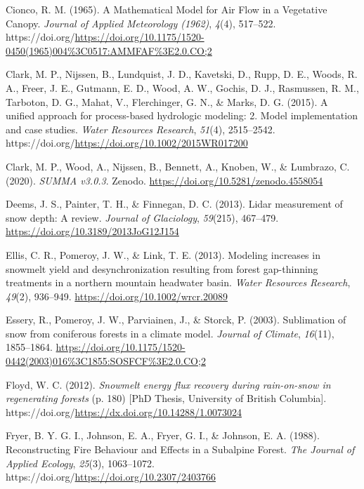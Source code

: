 \documentclass[
  letterpaper,
  DIV=11,
  numbers=noendperiod]{scrartcl}
\newlength{\cslhangindent}
\newenvironment{CSLReferences}[2] %
 {\begin{list}{}{%
  \setlength{\itemindent}{0pt}
  \setlength{\leftmargin}{0pt}
  \setlength{\parsep}{0pt}
  \ifodd #1
   \setlength{\leftmargin}{\cslhangindent}
   \setlength{\itemindent}{-1\cslhangindent}
  \fi
  \setlength{\itemsep}{#2\baselineskip}}}
 {\end{list}}
\begin{document}
\begin{CSLReferences}{1}{0}
Cionco, R. M. (1965). {A Mathematical Model for Air Flow in a Vegetative
Canopy}. \emph{Journal of Applied Meteorology (1962)}, \emph{4}(4),
517--522.
https://doi.org/\url{https://doi.org/10.1175/1520-0450(1965)004\%3C0517:AMMFAF\%3E2.0.CO;2}

Clark, M. P., Nijssen, B., Lundquist, J. D., Kavetski, D., Rupp, D. E.,
Woods, R. A., Freer, J. E., Gutmann, E. D., Wood, A. W., Gochis, D. J.,
Rasmussen, R. M., Tarboton, D. G., Mahat, V., Flerchinger, G. N., \&
Marks, D. G. (2015). {A unified approach for process-based hydrologic
modeling: 2. Model implementation and case studies}. \emph{Water
Resources Research}, \emph{51}(4), 2515--2542.
https://doi.org/\url{https://doi.org/10.1002/2015WR017200}

Clark, M. P., Wood, A., Nijssen, B., Bennett, A., Knoben, W., \&
Lumbrazo, C. (2020). \emph{{SUMMA v3.0.3}}. Zenodo.
\url{https://doi.org/10.5281/zenodo.4558054}

Deems, J. S., Painter, T. H., \& Finnegan, D. C. (2013). {Lidar
measurement of snow depth: A review}. \emph{Journal of Glaciology},
\emph{59}(215), 467--479. \url{https://doi.org/10.3189/2013JoG12J154}

Ellis, C. R., Pomeroy, J. W., \& Link, T. E. (2013). {Modeling increases
in snowmelt yield and desynchronization resulting from forest
gap-thinning treatments in a northern mountain headwater basin}.
\emph{Water Resources Research}, \emph{49}(2), 936--949.
\url{https://doi.org/10.1002/wrcr.20089}

Essery, R., Pomeroy, J. W., Parviainen, J., \& Storck, P. (2003).
{Sublimation of snow from coniferous forests in a climate model}.
\emph{Journal of Climate}, \emph{16}(11), 1855--1864.
\url{https://doi.org/10.1175/1520-0442(2003)016\%3C1855:SOSFCF\%3E2.0.CO;2}

Floyd, W. C. (2012). \emph{{Snowmelt energy flux recovery during
rain-on-snow in regenerating forests}} (p. 180) {[}PhD Thesis,
University of British Columbia{]}.
https://doi.org/\url{https://dx.doi.org/10.14288/1.0073024}

Fryer, B. Y. G. I., Johnson, E. A., Fryer, G. I., \& Johnson, E. A.
(1988). {Reconstructing Fire Behaviour and Effects in a Subalpine
Forest}. \emph{The Journal of Applied Ecology}, \emph{25}(3),
1063--1072. https://doi.org/\url{https://doi.org/10.2307/2403766}


\end{CSLReferences}
\end{document}
